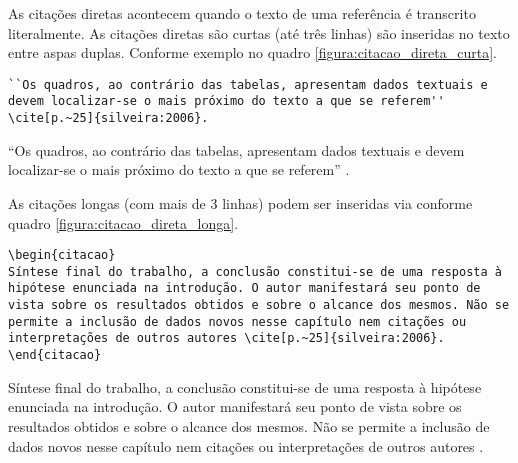As citações diretas acontecem quando o texto de uma referência é transcrito literalmente. As citações diretas são curtas (até três linhas) são inseridas no texto entre aspas duplas. Conforme exemplo no quadro \ref{figura:citacao_direta_curta}.

\begin{quadro}[htb]
\caption{Exemplo de citação direta curta}
\label{figura:citacao_direta_curta}
\hrulefill

\lstset{language=Tex, breaklines=true}
\begin{lstlisting}
``Os quadros, ao contrário das tabelas, apresentam dados textuais e devem localizar-se o mais próximo do texto a que se referem'' \cite[p.~25]{silveira:2006}.
\end{lstlisting}

\hrulefill

``Os quadros, ao contrário das tabelas, apresentam dados textuais e devem localizar-se o mais próximo do texto a que se referem'' \cite[p.~25]{silveira:2006:manual_tcc}.

\hrulefill
\end{quadro}

As citações longas (com mais de 3 linhas) podem ser inseridas via  conforme quadro \ref{figura:citacao_direta_longa}.

\begin{quadro}[htb]
\caption{Exemplo de citação direta longa}
\label{figura:citacao_direta_longa}
\hrulefill

\lstset{language=Tex, breaklines=true}
\begin{lstlisting}
\begin{citacao}
Síntese final do trabalho, a conclusão constitui-se de uma resposta à hipótese enunciada na introdução. O autor manifestará seu ponto de vista sobre os resultados obtidos e sobre o alcance dos mesmos. Não se permite a inclusão de dados novos nesse capítulo nem citações ou interpretações de outros autores \cite[p.~25]{silveira:2006}.
\end{citacao}
\end{lstlisting}

\hrulefill

\begin{citacao}
Síntese final do trabalho, a conclusão constitui-se de uma resposta à hipótese enunciada na introdução. O autor manifestará seu ponto de vista sobre os resultados obtidos e sobre o alcance dos mesmos. Não se permite a inclusão de dados novos nesse capítulo nem citações ou interpretações de outros autores \cite[p.~25]{silveira:2006:manual_tcc}.
\end{citacao}

\hrulefill

\end{quadro}